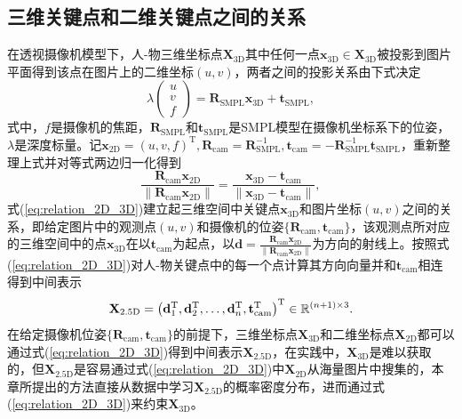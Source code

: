 \subsection{三维关键点和二维关键点之间的关系}
在透视摄像机模型下，人-物三维坐标点$\mathbf{X}_{\text{3D}}$其中任何一点$\mathbf{x}_{\text{3D}}\in\mathbf{X}_{\text{3D}}$被投影到图片平面得到该点在图片上的二维坐标$(u,v)$，两者之间的投影关系由下式决定
\begin{equation}\label{eq:projection}
	\lambda \left( \begin{array}{c} u \\ v \\ f \end{array} \right) = \mathbf{R}_{\text{SMPL}} \mathbf{x}_{\text{3D}} + \mathbf{t}_{\text{SMPL}},
\end{equation}
式中，$f$是摄像机的焦距，$\mathbf{R}_{\text{SMPL}}$和$\mathbf{t}_{\text{SMPL}}$是SMPL模型在摄像机坐标系下的位姿，$\lambda$是深度标量。记$\mathbf{x}_{\text{2D}} = (u, v, f)^{\mathrm{T}}, \mathbf{R}_{\text{cam}} = \mathbf{R}_{\text{SMPL}}^{-1}, \mathbf{t}_{\text{cam}}=- \mathbf{R}_{\text{SMPL}}^{-1}\mathbf{t}_{\text{SMPL}}$，重新整理上式并对等式两边归一化得到
\begin{equation}\label{eq:relation_2D_3D}
	\frac{\mathbf{R}_{\text{cam}} \mathbf{x}_{\text{2D}}}{\| \mathbf{R}_{\text{cam}} \mathbf{x}_{\text{2D}}\|} = \frac{\mathbf{x}_{\text{3D}} - \mathbf{t}_{\text{cam}}}{\| \mathbf{x}_{\text{3D}} - \mathbf{t}_{\text{cam}}\|},
\end{equation}
式(\ref{eq:relation_2D_3D})建立起三维空间中关键点$\mathbf{x}_{\text{3D}}$和图片坐标$(u, v)$之间的关系，即给定图片中的观测点$(u, v)$和摄像机的位姿$\{\mathbf{R}_{\text{cam}}, \mathbf{t}_{\text{cam}}\}$，该观测点所对应的三维空间中的点$\mathbf{x}_{\text{3D}}$在以$\mathbf{t}_{\text{cam}}$为起点，以$\mathbf{d}=\frac{\mathbf{R}_{\text{cam}} \mathbf{x}_{\text{2D}}}{\| \mathbf{R}_{\text{cam}} \mathbf{x}_{\text{2D}}\|}$为方向的射线上。按照式(\ref{eq:relation_2D_3D})对人-物关键点中的每一个点计算其方向向量并和$\mathbf{t}_{\text{cam}}$相连得到中间表示
\begin{equation}\label{eq:inter_representation}
	\mathbf{X}_{\text{2.5D}} = \left( \mathbf{d}_1^{\mathrm{T}}, \mathbf{d}_2^{\mathrm{T}}, \dots, \mathbf{d}_n^{\mathrm{T}}, \mathbf{t}_{\text{cam}}^{\rm{T}} \right)^{\mathrm{T}}\in\mathbb{R}^{(n+1)\times 3}.
\end{equation}
在给定摄像机位姿$\{\mathbf{R}_{\text{cam}}, \mathbf{t}_{\text{cam}}\}$的前提下，三维坐标点$\mathbf{X}_{\text{3D}}$和二维坐标点$\mathbf{X}_{\text{2D}}$都可以通过式(\ref{eq:relation_2D_3D})得到中间表示$\mathbf{X}_{\text{2.5D}}$，在实践中，$\mathbf{X}_{\text{3D}}$是难以获取的，但$\mathbf{X}_{\text{2.5D}}$是容易通过式(\ref{eq:relation_2D_3D})中$\mathbf{X}_\text{2D}$从海量图片中搜集的，本章所提出的方法直接从数据中学习$\mathbf{X}_{\text{2.5D}}$的概率密度分布，进而通过式(\ref{eq:relation_2D_3D})来约束$\mathbf{X}_{\text{3D}}$。

